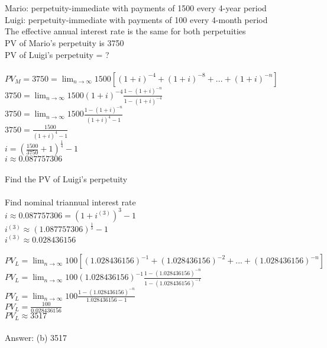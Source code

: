 \documentclass[12pt]{article}
\begin{document}
\section{}
Mario: perpetuity-immediate with payments of 1500 every 4-year period\\
Luigi: perpetuity-immediate with payments of 100 every 4-month period\\
The effective annual interest rate is the same for both perpetuities\\
PV of Mario's perpetuity is 3750\\
PV of Luigi's perpetuity = ?\\
\\
$PV_M=3750=\lim_{n\to\infty}1500[(1+i)^{-4}+(1+i)^{-8}+...+(1+i)^{-n}]$\\
$3750=\lim_{n\to\infty}1500(1+i)^{-4}\frac{1-(1+i)^{-n}}{1-(1+i)^{-4}}$\\
$3750=\lim_{n\to\infty}1500\frac{1-(1+i)^{-n}}{(1+i)^{4}-1}$\\
$3750=\frac{1500}{(1+i)^{4}-1}$\\
$i=(\frac{1500}{3750}+1)^{\frac{1}{4}}-1$\\
$i\approx0.087757306$\\
\\
Find the PV of Luigi's perpetuity\\
\\
Find nominal triannual interest rate\\
$i\approx0.087757306=(1+i^{(3)})^{3}-1$\\
$i^{(3)}\approx(1.087757306)^{\frac{1}{3}}-1$\\
$i^{(3)}\approx0.028436156$\\
\\
$PV_L=\lim_{n\to\infty}100[(1.028436156)^{-1}+(1.028436156)^{-2}+...+(1.028436156)^{-n}]$\\
$PV_L=\lim_{n\to\infty}100(1.028436156)^{-1}\frac{1-(1.028436156)^{-n}}{1-(1.028436156)^{-1}}$\\
$PV_L=\lim_{n\to\infty}100\frac{1-(1.028436156)^{-n}}{1.028436156-1}$\\
$PV_L=\frac{100}{0.028436156}$\\
$PV_L\approx3517$\\
\\
Answer: (b) 3517
\end{document}
